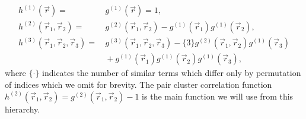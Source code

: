 \begin{subequations}\label{eq:cluster-correlation-functions}
  \begin{align}
    h^{(1)}(\vec{r})
    =& \,
    g^{(1)}(\vec{r})
    = 1,
    \\
    h^{(2)}(\vec{r}_1, \vec{r}_2)
    =& \,
    g^{(2)}(\vec{r}_1, \vec{r}_2)
    - g^{(1)}(\vec{r}_1) g^{(1)}(\vec{r}_2),
    \label{eq:pair-cluster-correlation-function}
    \\
    h^{(3)}(\vec{r}_1, \vec{r}_2, \vec{r}_3)
    =& \,
    g^{(3)}(\vec{r}_1, \vec{r}_2, \vec{r}_3)
    - \{3\} g^{(2)}(\vec{r}_1, \vec{r}_2) g^{(1)}(\vec{r}_3)
    \nonumber \\ & \,
    + g^{(1)}(\vec{r}_1) g^{(1)}(\vec{r}_2) g^{(1)}(\vec{r}_3),
  \end{align}
\end{subequations}
where $\{\cdot\}$ indicates the number of similar terms which differ only by permutation of indices which we omit for brevity.
The pair cluster correlation function%
$h^{(2)}(\vec{r}_1, \vec{r}_2) = g^{(2)}(\vec{r}_1, \vec{r}_2) - 1$ is the main function we will use from this hierarchy.

